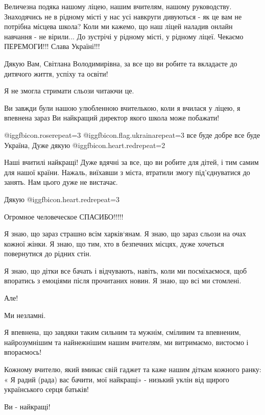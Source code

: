 \begin{itemize}
Величезна подяка нашому ліцею, нашим вчителям, нашому руководству. Знаходячись
не в рідному місті у нас усі навкруги дивуються - як це вам не потрібна місцева
школа? Коли ми кажемо, що наш ліцей наладив онлайн навчання - не вірили... До
зустрічі у рідному місті, у рідному ліцеї. Чекаємо ПЕРЕМОГИ!!! Слава Україні!!!


Дякую Вам, Світлана Володимирівна, за все що ви робите та вкладаєте до дитячого життя, успіху та освіти!

Я не змогла стримати сльози читаючи це.

Ви завжди були нашою улюбленною вчителькою, коли я вчилася у ліцею, я впевнена
зараз Ви найкращий директор якого школа може побажати!


@igg{fbicon.rose}{repeat=3} @igg{fbicon.flag.ukraina}{repeat=3} все буде добре
все буде Україна, Дуже дякую @igg{fbicon.heart.red}{repeat=2}


Наші вчитилі найкращі! Дуже вдячні за все, що ви робите для дітей, і тим самим
для нашої країни. Нажаль, виїхавши з міста, втратили змогу під'єднуватися до
занять. Нам цього дуже не вистачає.

Дякую @igg{fbicon.heart.red}{repeat=3}

Огромное человеческое СПАСИБО!!!!!


Я знаю, що зараз страшно всім харків‘янам. Я знаю, що зараз сльози на очах
кожної жінки. Я знаю, що тим, хто в безпечних місцях, дуже хочеться повернутися
до рідних стін.

Я знаю, що дітки все бачать і відчувають, навіть, коли ми посміхаємося, щоб
впоратись з емоціями після прочитаних новин. Я знаю, що всі ми стомлені.

Але!

Ми незламні.

Я впевнена, що завдяки таким сильним та мужнім, сміливим та впевненим,
найрозумнішим та найнежнішим нашим вчителям, ми витримаємо, вистоємо і
впораємось!

Кожному вчителю, який вмикає свій гаджет та каже нашим діткам кожного ранку: «
Я радий (рада) вас бачити, мої найкращі» - низький уклін від щирого українського
серця батьків!

Ви - найкращі!



\end{itemize}
